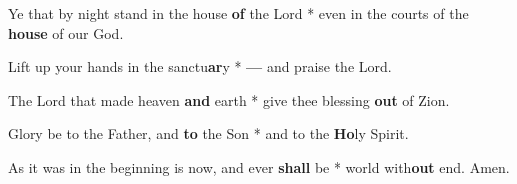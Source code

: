 \begin{multicols}{2}
	Ye that by night stand in the house \textbf{of} the Lord * even in the courts of the \textbf{house} of our God.
	
	Lift up your hands in the sanctu\textbf{ar}y * \textbf{---} and praise the Lord.
	
	The Lord that made heaven \textbf{and} earth * give thee blessing \textbf{out} of Zion.
	
	Glory be to the Father, and \textbf{to} the Son * and to the \textbf{Ho}ly Spirit.
	
	As it was in the beginning is now, and ever \textbf{shall} be * world with\textbf{out} end. Amen.
\end{multicols}